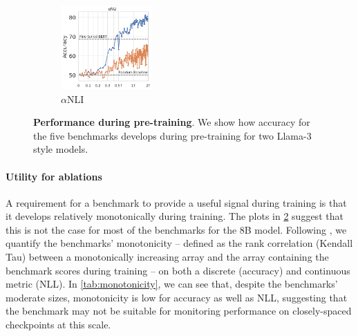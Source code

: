 \begin{figure}[t]
\begin{subfigure}[b]{0.19\textwidth}
    \centering
    \includegraphics[height=3.2cm, trim=11mm 0 0 0, clip]{figures/abductivenli_intermediate}
    \caption{$\alpha$NLI}
    \label{fig:alphanli_int}
    \end{subfigure}
    \caption{\textbf{Performance during pre-training}. 
    We show how accuracy for the five benchmarks develops during pre-training for two Llama-3 style models.}\label{fig:performance_training}
\end{figure}

\begin{table}
\centering
{}
    \caption{\textbf{Monotonicity values during the course of training.} We report monotonicity both for accuracy ($mon_{Acc}$) and negative log likelihood of the correct answer ($mon_{NLL}$).}
\label{tab:monotonicity}
\end{table}

\paragraph{Utility for ablations}
A requirement for a benchmark to provide a useful signal during training is that it develops relatively monotonically during training.
The plots in \cref{fig:performance_training} suggest that this is not the case for most of the benchmarks for the 8B model.
Following \citet{variancepaper}, we quantify the benchmarks' monotonicity -- defined as the rank correlation (Kendall Tau) between a monotonically increasing array and the array containing the benchmark scores during training -- on both a discrete (accuracy) and continuous metric (NLL). 
In \cref{tab:monotonicity}, we can see that, despite the benchmarks' moderate sizes, monotonicity is low for accuracy as well as NLL, suggesting that the benchmark may not be suitable for monitoring performance on closely-spaced checkpoints at this scale. 

